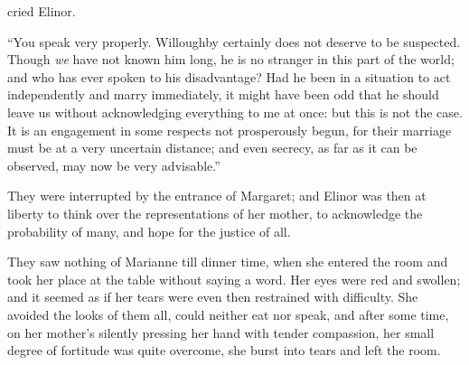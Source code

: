  cried Elinor. 

“You speak very properly. Willoughby certainly does not deserve to be suspected. Though {\em we} have not known him long, he is no stranger in this part of the world; and who has ever spoken to his disadvantage? Had he been in a situation to act independently and marry immediately, it might have been odd that he should leave us without acknowledging everything to me at once: but this is not the case. It is an engagement in some respects not prosperously begun, for their marriage must be at a very uncertain distance; and even secrecy, as far as it can be observed, may now be very advisable.”

They were interrupted by the entrance of Margaret; and Elinor was then at liberty to think over the representations of her mother, to acknowledge the probability of many, and hope for the justice of all.

They saw nothing of Marianne till dinner time, when she entered the room and took her place at the table without saying a word. Her eyes were red and swollen; and it seemed as if her tears were even then restrained with difficulty. She avoided the looks of them all, could neither eat nor speak, and after some time, on her mother's silently pressing her hand with tender compassion, her small degree of fortitude was quite overcome, she burst into tears and left the room.

